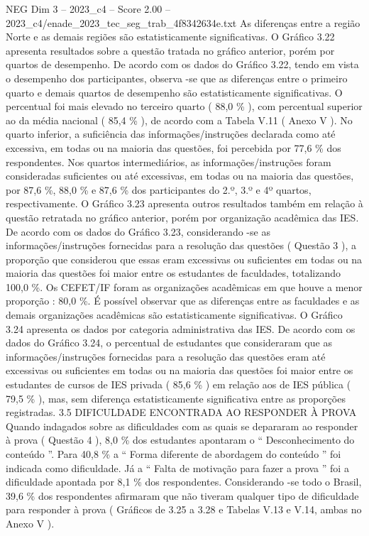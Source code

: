\begin{textsample}{NEG Dim 3 – 2023\_c4 – Score 2.00 – 2023\_c4/enade\_2023\_tec\_seg\_trab\_4f8342634e.txt}
As diferenças entre a região Norte e as demais regiões são estatisticamente significativas.
O Gráfico 3.22 apresenta resultados sobre a questão tratada no gráfico anterior, porém por quartos de desempenho.
De acordo com os dados do Gráfico 3.22, tendo em vista o desempenho dos participantes, observa -se que as diferenças entre o primeiro quarto e demais quartos de desempenho são estatisticamente significativas.
O percentual foi mais elevado no terceiro quarto ( 88,0 \% ), com percentual superior ao da média nacional ( 85,4 \% ), de acordo com a Tabela V.11 ( Anexo V ).
No quarto inferior, a suficiência das informações/instruções declarada como até excessiva, em todas ou na maioria das questões, foi percebida por 77,6 \% dos respondentes.
Nos quartos intermediários, as informações/instruções foram consideradas suficientes ou até excessivas, em todas ou na maioria das questões, por 87,6 \%, 88,0 \% e 87,6 \% dos participantes do 2.º, 3.º e 4º quartos, respectivamente.
O Gráfico 3.23 apresenta outros resultados também em relação à questão retratada no gráfico anterior, porém por organização acadêmica das IES.
De acordo com os dados do Gráfico 3.23, considerando -se as informações/instruções fornecidas para a resolução das questões ( Questão 3 ), a proporção que considerou que essas eram excessivas ou suficientes em todas ou na maioria das questões foi maior entre os estudantes de faculdades, totalizando 100,0 \%.
Os CEFET/IF foram as organizações acadêmicas em que houve a menor proporção : 80,0 \%.
É possível observar que as diferenças entre as faculdades e as demais organizações acadêmicas são estatisticamente significativas.
O Gráfico 3.24 apresenta os dados por categoria administrativa das IES.
De acordo com os dados do Gráfico 3.24, o percentual de estudantes que consideraram que as informações/instruções fornecidas para a resolução das questões eram até excessivas ou suficientes em todas ou na maioria das questões foi maior entre os estudantes de cursos de IES privada ( 85,6 \% ) em relação aos de IES pública ( 79,5 \% ), mas, sem diferença estatisticamente significativa entre as proporções registradas. 3.5 DIFICULDADE ENCONTRADA AO RESPONDER À PROVA Quando indagados sobre as dificuldades com as quais se depararam ao responder à prova ( Questão 4 ), 8,0 \% dos estudantes apontaram o “ Desconhecimento do conteúdo ”.
Para 40,8 \% a “ Forma diferente de abordagem do conteúdo ” foi indicada como dificuldade.
Já a “ Falta de motivação para fazer a prova ” foi a dificuldade apontada por 8,1 \% dos respondentes.
Considerando -se todo o Brasil, 39,6 \% dos respondentes afirmaram que não tiveram qualquer tipo de dificuldade para responder à prova ( Gráficos de 3.25 a 3.28 e Tabelas V.13 e V.14, ambas no Anexo V ).

\end{textsample}
